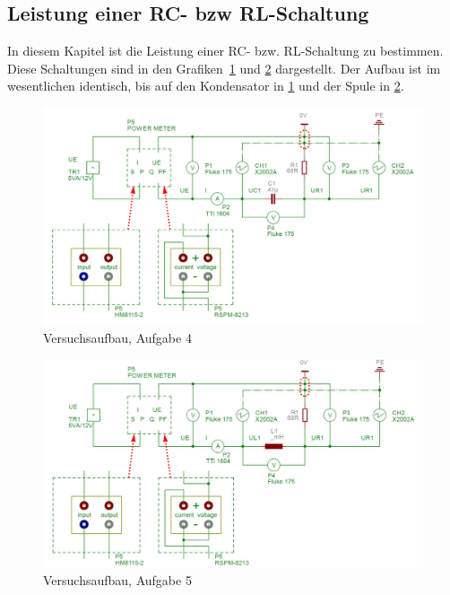 \documentclass{article}
\begin{document}
\subsection{Leistung einer RC- bzw RL-Schaltung}

In diesem Kapitel ist die Leistung einer RC- bzw. RL-Schaltung zu bestimmen. Diese Schaltungen sind in den Grafiken~\ref{fig:aufbau_task4} und \ref{fig:aufbau_task5} dargestellt. Der Aufbau ist im wesentlichen identisch, bis auf den Kondensator in \ref{fig:aufbau_task4} und der Spule in \ref{fig:aufbau_task5}.



\begin{figure}[H]
\centering
\caption{Versuchsaufbau, Aufgabe 4}
\label{fig:aufbau_task4}
\includegraphics[scale=1]{bilder/aufbau_task4.png}
\end{figure}



\begin{figure}[H]
\centering
\caption{Versuchsaufbau, Aufgabe 5}
\label{fig:aufbau_task5}
\includegraphics[scale=1]{bilder/aufbau_task5.png}
\end{figure}
\end{document}
